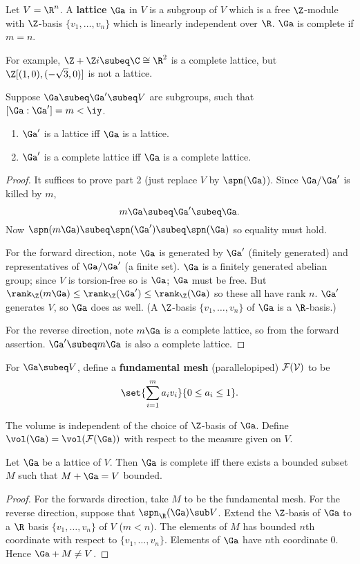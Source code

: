 \begin{df}
Let $V=\R^n$. A \textbf{lattice} $\Ga$ in $V$ is a subgroup of $V$ which is a free $\Z$-module with $\Z$-basis $\{v_1,\ldots, v_n\}$ which is linearly independent over $\R$. $\Ga$ is complete if $m=n$.
\end{df}
For example, $\Z+\Z i\subeq\C\cong \R^2$ is a complete lattice, but $\Z[(1,0),(-\sqrt 3,0)]$ is not a lattice.

\begin{pr}
Suppose $\Ga\subeq \Ga'\subeq V$ are subgroups, such that $[\Ga:\Ga']=m<\iy$. 
\begin{enumerate}
\item
$\Ga'$ is a lattice iff $\Ga$ is a lattice.
\item
$\Ga'$ is a complete lattice iff $\Ga$ is a complete lattice.
\end{enumerate}
\end{pr}
\begin{proof}
It suffices to prove part 2 (just replace $V$ by $\spn(\Ga)$).
Since $\Ga/\Ga'$ is killed by $m$,
\[
m\Ga\subeq \Ga'\subeq \Ga.
\]
Now $\spn(m\Ga)\subeq \spn(\Ga')\subeq \spn(\Ga)$ so equality must hold.

For the forward direction, note $\Ga$ is generated by $\Ga'$ (finitely generated) and representatives of $\Ga/\Ga'$ (a finite set). $\Ga$ is a finitely generated abelian group; since $V$ is torsion-free so is $\Ga$; $\Ga$ must be free. But $\rank_{\Z}(m\Ga)\le\rank_{\Z}(\Ga')\le \rank_{\Z}(\Ga)$ so these all have rank $n$. $\Ga'$ generates $V$, so $\Ga$ does as well. (A $\Z$-basis $\{v_1,\ldots, v_n\}$ of $\Ga$ is a $\R$-basis.)

For the reverse direction, note $m\Ga$ is a complete lattice, so from the forward assertion. $\Ga'\subeq m\Ga$ is also a complete lattice.
\end{proof}
\begin{df}
For $\Ga\subeq V$, define a \textbf{fundamental mesh} (parallelopiped) $\cal F(V)$ to be
\[
\set{\sum_{i=1}^m a_iv_i}{0\le a_i\le 1}.
\] 
\end{df}
The volume is independent of the choice of $\Z$-basis of $\Ga$.
Define $\vol(\Ga)=\vol(\cal F(\Ga))$ with respect to the measure given on $V$.
\begin{pr}\label{bounded-subset-add}
Let $\Ga$ be a lattice of $V$. Then $\Ga$ is complete iff there exists a bounded subset $M$ such that $M+\Ga= V$ bounded.
\end{pr}
\begin{proof}
For the forwards direction, take $M$ to be the fundamental mesh. For the reverse direction, suppose \bwoc{} that $\spn_{\R}(\Ga)\sub V$. Extend the $\Z$-basis of $\Ga$ to a $\R$ basis $\{v_1,\ldots,v_n\}$ of $V$ ($m<n$). The elements of $M$ has bounded $n$th coordinate with respect to $\{v_1,\ldots, v_n\}$. Elements of $\Ga$ have $n$th coordinate 0. Hence $\Ga+M\ne V$.
\end{proof}
